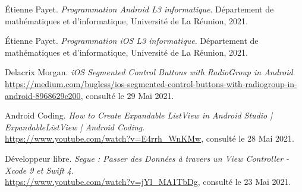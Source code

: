 \documentclass{article}
\begin{document}
\begin{thebibliography}{9}
Étienne Payet.
\textit{Programmation Android L3 informatique}. 
Département de mathématiques et d’informatique, Université de La Réunion, 2021.

Étienne Payet.
\textit{Programmation iOS L3 informatique}. 
Département de mathématiques et d’informatique, Université de La Réunion, 2021.

Delacrix Morgan.
\textit{iOS Segmented Control Buttons with RadioGroup in Android}.\\
\url{https://medium.com/bugless/ios-segmented-control-buttons-with-radiogroup-in-android-8968629c200}, consulté le 29 Mai 2021.

Android Coding.
\textit{How to Create Expandable ListView in Android Studio | ExpandableListView | Android Coding}.\\
\url{https://www.youtube.com/watch?v=E4rrh_WnKMw}, consulté le 28 Mai 2021.

Développeur libre.
\textit{Segue : Passer des Données à travers un View Controller - Xcode 9 et Swift 4}.\\
\url{https://www.youtube.com/watch?v=jYl_MA1TbDg}, consulté le 23 Mai 2021. 

\end{thebibliography}
\end{document}
